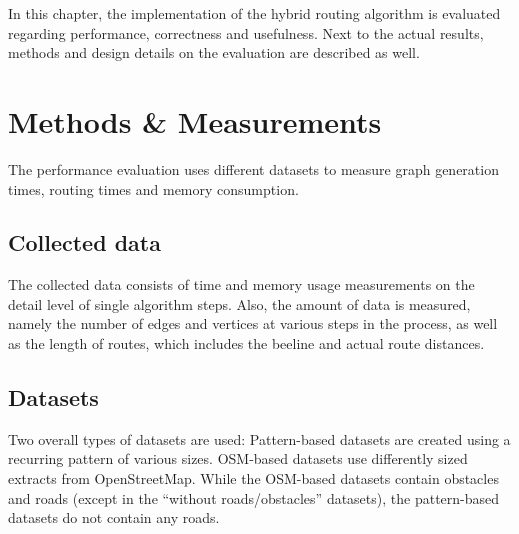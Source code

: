 
In this chapter, the implementation of the hybrid routing algorithm is evaluated regarding performance, correctness and usefulness.
Next to the actual results, methods and design details on the evaluation are described as well.

\section{Methods \& Measurements}

	The performance evaluation uses different datasets to measure graph generation times, routing times and memory consumption.

	\subsection{Collected data}
	
		The collected data consists of time and memory usage measurements on the detail level of single algorithm steps.
		Also, the amount of data is measured, namely the number of edges and vertices at various steps in the process, as well as the length of routes, which includes the beeline and actual route distances.
	
	\subsection{Datasets}
	\label{subsubsec:eval-datasets}
	
		Two overall types of datasets are used:
		Pattern-based datasets are created using a recurring pattern of various sizes.
		OSM-based datasets use differently sized extracts from OpenStreetMap.
		While the OSM-based datasets contain obstacles and roads (except in the \enquote{without roads/obstacles} datasets), the pattern-based datasets do not contain any roads.
		
